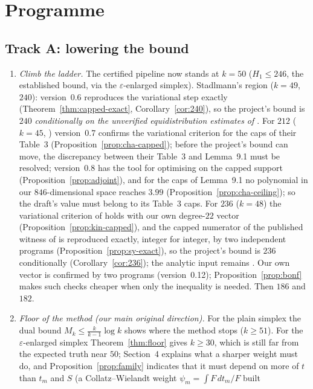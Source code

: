 \section{Programme}\label{sec:prog}

\subsection*{Track A: lowering the bound}
\begin{enumerate}
\item \emph{Climb the ladder.} The certified pipeline now stands at $k=50$
($H_1\le246$, the established bound, via the $\varepsilon$-enlarged simplex).
Stadlmann's region ($k=49$, $240$): version~0.6 reproduces the variational
step exactly (Theorem~\ref{thm:capped-exact}, Corollary~\ref{cor:240}), so the
project's bound is $240$ \emph{conditionally on the unverified
equidistribution estimates of \cite{Sta26}}. For $212$ ($k=45$,
\cite{Cha26}) version~0.7 confirms the variational criterion for the caps of
their Table~3 (Proposition~\ref{prop:cha-capped}); before the project's bound
can move, the discrepancy between their Table~3 and Lemma~9.1 must be
resolved; version~0.8 has the tool for optimising on the capped support
(Proposition~\ref{prop:adjoint}), and for the caps of Lemma~9.1 no polynomial in
our $846$-dimensional space reaches $3.99$ (Proposition~\ref{prop:cha-ceiling});
so the draft's value must belong to its Table~3 caps. For $236$ ($k=48$) the variational criterion of \cite{Kin26} holds with
our own degree-$22$ vector (Proposition~\ref{prop:kin-capped}), and the
capped numerator of the published witness of \cite{SY26} is reproduced
exactly, integer for integer, by two independent programs
(Proposition~\ref{prop:sy-exact}), so the project's bound is $236$
conditionally (Corollary~\ref{cor:236}); the analytic input remains
. Our own vector is confirmed by
two programs (version~0.12); Proposition~\ref{prop:bonf} makes such checks cheaper
when only the inequality is needed. Then
$186$ and $182$.
\item \emph{Floor of the method (our main original direction).} For the plain
simplex the dual bound $M_k\le\frac{k}{k-1}\log k$ shows where the method
stops ($k\ge51$). For the $\varepsilon$-enlarged simplex
Theorem~\ref{thm:floor} gives $k\ge30$, which is still far from the expected
truth near $50$; Section~4 explains what a sharper weight must do, and
Proposition~\ref{prop:family} indicates that it must depend on more of $t$
than $t_m$ and $S$ (a Collatz--Wielandt weight $\psi_m=\int F\,dt_m/F$ built

\end{enumerate}
